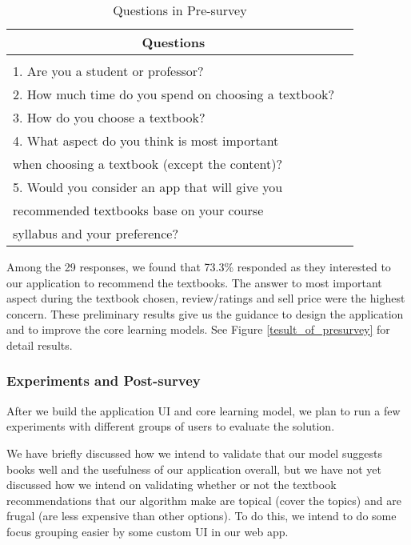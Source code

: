 \begin{table}[ht] 
\caption{Questions in Pre-survey}
\label{Pre-survey}
\begin{center}
\begin{tabular}{ll}
\multicolumn{1}{c}{\bf Questions} 
\\ \hline \\
1. Are you a student or professor?\\
2. How much time do you spend on choosing a textbook?\\
3. How do you choose a textbook?\\
4. What aspect do you think is most important\\
when choosing a textbook (except the content)? \\
5. Would you consider an app that will give you \\
recommended textbooks base on your course \\
syllabus and your preference? \\
\end{tabular}
\end{center}
\end{table}
Among the 29 responses, we found that 73.3\% responded as they interested to our application to recommend the textbooks. The answer to most important aspect during the textbook chosen, review/ratings and sell price were the highest concern. These preliminary results give us the guidance to design the application and to improve the core learning models. See Figure \ref{tesult_of_presurvey} for detail results.


	\subsubsection{Experiments and Post-survey}
After we build the application UI and core learning model, we plan to run a few experiments with different groups of users to evaluate the solution.

We have briefly discussed how we intend to validate that our model suggests books well and the usefulness of our application overall, but we have not yet discussed how we intend on validating whether or not the textbook recommendations that our algorithm make are topical (cover the topics) and are frugal (are less expensive than other options).  
To do this, we intend to do some focus grouping easier by some custom UI in our web app.

